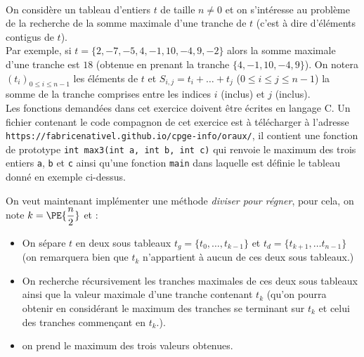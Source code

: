 \documentclass[11pt,a4paper]{article}
\begin{document}
\begin{Exercise*}[title = {type B}]\\
	On considère un tableau d'entiers $t$ de taille $n \neq  0$ et on s'intéresse au problème de la recherche de la somme maximale d'une tranche de  $t$ (c'est à dire d'éléments contigus de $t$).\\
	Par exemple, si $t = \{2, -7, -5, 4, -1, 10, -4, 9, -2\}$ alors la somme maximale d'une tranche est $18$ (obtenue en prenant la tranche $\{4, -1, 10, -4, 9\}$). On notera $(t_i)_{0  \leqslant i \leqslant n-1}$ les éléments de $t$ et $S_{i,j} = t_i+ \dots +t_j$ ($0 \leqslant i \leqslant j \leqslant n-1$) la somme de la tranche comprises entre les indices $i$ (inclus) et $j$ (inclus).\\
	Les fonctions demandées dans cet exercice doivent être écrites en langage C. Un fichier contenant le code compagnon de cet exercice est à télécharger à l'adresse {\tt https://fabricenativel.github.io/cpge-info/oraux/}, il contient une fonction de prototype \texttt{int max3(int a, int b, int c)} qui renvoie le maximum des trois entiers {\tt a}, {\tt b} et {\tt c} ainsi qu'une fonction {\tt main} dans laquelle est définie le tableau donné en exemple ci-dessus.
	\ifcorrige
	\fi
	
	\NRet \smallskip
	On veut maintenant implémenter une méthode \textit{diviser pour régner}, pour cela, on note $k = \PE{\dfrac{n}{2}}$ et :
	\begin{itemize}
		\item On sépare $t$ en deux sous tableaux $t_g = \{t_0, \dots, t_{k-1}\}$ et $t_d = \{ t_{k+1}, \dots t_{n-1} \}$ (on remarquera bien que $t_k$ n'appartient à aucun de ces deux sous tableaux.)
		\item On recherche récursivement les tranches maximales de ces deux sous tableaux ainsi que la valeur maximale d'une tranche contenant $t_k$ (qu'on pourra obtenir en considérant le maximum des tranches se terminant sur $t_k$ et celui des tranches commençant en $t_k$.).
		\item on prend le maximum des trois valeurs obtenues.
	\end{itemize}


\end{Exercise*}
\end{document}
